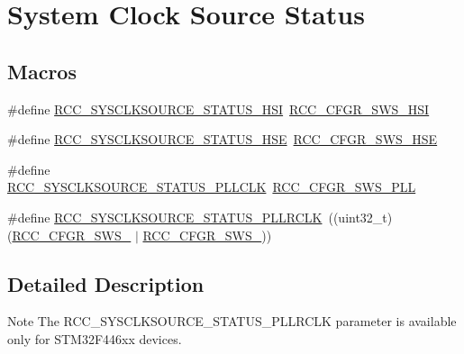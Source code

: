 \hypertarget{group___r_c_c___system___clock___source___status}{}\section{System Clock Source Status}
\label{group___r_c_c___system___clock___source___status}
\subsection*{Macros}
\begin{DoxyCompactItemize}
\item 
\#define \hyperlink{group___r_c_c___system___clock___source___status_ga0d6c2b0b2d59e6591295649853bb2abd}{R\+C\+C\+\_\+\+S\+Y\+S\+C\+L\+K\+S\+O\+U\+R\+C\+E\+\_\+\+S\+T\+A\+T\+U\+S\+\_\+\+H\+SI}~\hyperlink{group___peripheral___registers___bits___definition_ga6764639cf221e1ebc0b5448dcaed590a}{R\+C\+C\+\_\+\+C\+F\+G\+R\+\_\+\+S\+W\+S\+\_\+\+H\+SI}
\item 
\#define \hyperlink{group___r_c_c___system___clock___source___status_ga3847769265bf19becf7b976a7e908a64}{R\+C\+C\+\_\+\+S\+Y\+S\+C\+L\+K\+S\+O\+U\+R\+C\+E\+\_\+\+S\+T\+A\+T\+U\+S\+\_\+\+H\+SE}~\hyperlink{group___peripheral___registers___bits___definition_gae09a0202f441c1a43e69c62331d50a08}{R\+C\+C\+\_\+\+C\+F\+G\+R\+\_\+\+S\+W\+S\+\_\+\+H\+SE}
\item 
\#define \hyperlink{group___r_c_c___system___clock___source___status_ga4f05019ec09da478d084f44dbaad7d6d}{R\+C\+C\+\_\+\+S\+Y\+S\+C\+L\+K\+S\+O\+U\+R\+C\+E\+\_\+\+S\+T\+A\+T\+U\+S\+\_\+\+P\+L\+L\+C\+LK}~\hyperlink{group___peripheral___registers___bits___definition_ga2c67e2279804a83ef24438267d9d4a6c}{R\+C\+C\+\_\+\+C\+F\+G\+R\+\_\+\+S\+W\+S\+\_\+\+P\+LL}
\item 
\#define \hyperlink{group___r_c_c___system___clock___source___status_gafb2aec046cc6759c3b290a3eeebe7d75}{R\+C\+C\+\_\+\+S\+Y\+S\+C\+L\+K\+S\+O\+U\+R\+C\+E\+\_\+\+S\+T\+A\+T\+U\+S\+\_\+\+P\+L\+L\+R\+C\+LK}~((uint32\+\_\+t)(\hyperlink{group___peripheral___registers___bits___definition_ga1eae59112c51def51979e31e8695b39f}{R\+C\+C\+\_\+\+C\+F\+G\+R\+\_\+\+S\+W\+S\+\_} $\vert$ \hyperlink{group___peripheral___registers___bits___definition_gaad3a5718999d7259f216137a23c2a379}{R\+C\+C\+\_\+\+C\+F\+G\+R\+\_\+\+S\+W\+S\+\_}))
\end{DoxyCompactItemize}


\subsection{Detailed Description}
\begin{DoxyNote}{Note}
The R\+C\+C\+\_\+\+S\+Y\+S\+C\+L\+K\+S\+O\+U\+R\+C\+E\+\_\+\+S\+T\+A\+T\+U\+S\+\_\+\+P\+L\+L\+R\+C\+LK parameter is available only for S\+T\+M32\+F446xx devices. 
\end{DoxyNote}


